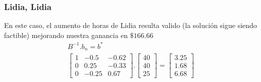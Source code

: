 \begin{homeworkProblem}
\subsubsection{Lidia, Lidia}
En este caso, el aumento de horas de Lidia resulta valido (la solución sigue siendo factible) mejorando nuestra ganancia en $\$166.66$
\begin{align*}
    B^{-1}.b_n = b^{*} \\
    \begin{bmatrix}
        1 & -0.5 & -0.62 \\
        0 & 0.25 & -0.33 \\
        0 & -0.25 & 0.67 
    \end{bmatrix}.
    \begin{bmatrix}
        40 \\
        40 \\
        25
    \end{bmatrix}=
    \begin{bmatrix}
        3.25 \\
        1.68\\
        6.68
    \end{bmatrix}
\end{align*}

\end{homeworkProblem}